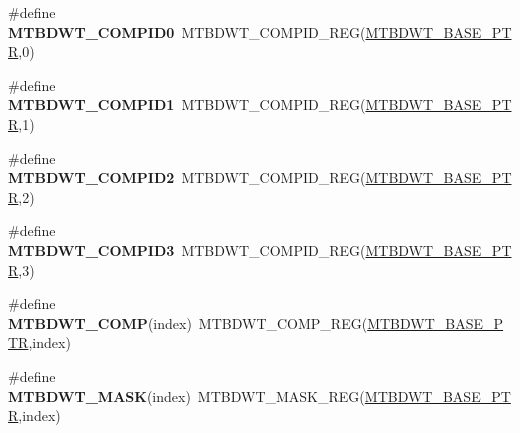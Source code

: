\begin{DoxyCompactItemize}
\#define {\bfseries M\+T\+B\+D\+W\+T\+\_\+\+C\+O\+M\+P\+I\+D0}~M\+T\+B\+D\+W\+T\+\_\+\+C\+O\+M\+P\+I\+D\+\_\+\+R\+EG(\hyperlink{group___m_t_b_d_w_t___peripheral_ga97d048bfb5a11293a38c444b8347ff42}{M\+T\+B\+D\+W\+T\+\_\+\+B\+A\+S\+E\+\_\+\+P\+TR},0)
\item 
\mbox{\label{group___m_t_b_d_w_t___register___accessor___macros_gad1e9f6c3c5eeeeab187787e6eff15d4e}} 
\#define {\bfseries M\+T\+B\+D\+W\+T\+\_\+\+C\+O\+M\+P\+I\+D1}~M\+T\+B\+D\+W\+T\+\_\+\+C\+O\+M\+P\+I\+D\+\_\+\+R\+EG(\hyperlink{group___m_t_b_d_w_t___peripheral_ga97d048bfb5a11293a38c444b8347ff42}{M\+T\+B\+D\+W\+T\+\_\+\+B\+A\+S\+E\+\_\+\+P\+TR},1)
\item 
\mbox{\label{group___m_t_b_d_w_t___register___accessor___macros_gade8bf5b51854635778d28fbb31174a12}} 
\#define {\bfseries M\+T\+B\+D\+W\+T\+\_\+\+C\+O\+M\+P\+I\+D2}~M\+T\+B\+D\+W\+T\+\_\+\+C\+O\+M\+P\+I\+D\+\_\+\+R\+EG(\hyperlink{group___m_t_b_d_w_t___peripheral_ga97d048bfb5a11293a38c444b8347ff42}{M\+T\+B\+D\+W\+T\+\_\+\+B\+A\+S\+E\+\_\+\+P\+TR},2)
\item 
\mbox{\label{group___m_t_b_d_w_t___register___accessor___macros_ga3a9bd5acf838d38819681843c6fea66f}} 
\#define {\bfseries M\+T\+B\+D\+W\+T\+\_\+\+C\+O\+M\+P\+I\+D3}~M\+T\+B\+D\+W\+T\+\_\+\+C\+O\+M\+P\+I\+D\+\_\+\+R\+EG(\hyperlink{group___m_t_b_d_w_t___peripheral_ga97d048bfb5a11293a38c444b8347ff42}{M\+T\+B\+D\+W\+T\+\_\+\+B\+A\+S\+E\+\_\+\+P\+TR},3)
\item 
\mbox{\label{group___m_t_b_d_w_t___register___accessor___macros_ga66a9e86272e57446b4e31c0cdf57c400}} 
\#define {\bfseries M\+T\+B\+D\+W\+T\+\_\+\+C\+O\+MP}(index)~M\+T\+B\+D\+W\+T\+\_\+\+C\+O\+M\+P\+\_\+\+R\+EG(\hyperlink{group___m_t_b_d_w_t___peripheral_ga97d048bfb5a11293a38c444b8347ff42}{M\+T\+B\+D\+W\+T\+\_\+\+B\+A\+S\+E\+\_\+\+P\+TR},index)
\item 
\mbox{\label{group___m_t_b_d_w_t___register___accessor___macros_ga50843befc894854f828928abd04d8efa}} 
\#define {\bfseries M\+T\+B\+D\+W\+T\+\_\+\+M\+A\+SK}(index)~M\+T\+B\+D\+W\+T\+\_\+\+M\+A\+S\+K\+\_\+\+R\+EG(\hyperlink{group___m_t_b_d_w_t___peripheral_ga97d048bfb5a11293a38c444b8347ff42}{M\+T\+B\+D\+W\+T\+\_\+\+B\+A\+S\+E\+\_\+\+P\+TR},index)

\end{DoxyCompactItemize}
